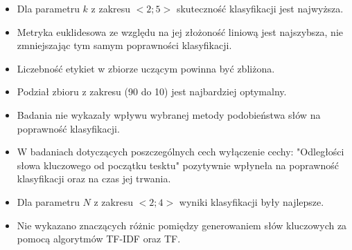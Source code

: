 \documentclass{classrep}
\begin{document}

\begin{itemize}
    \item Dla parametru $k$ z zakresu $<2;5>$ skuteczność klasyfikacji jest najwyższa.
    \item Metryka euklidesowa ze względu na jej złożoność liniową jest najszybsza, nie zmniejszając
            tym samym poprawności klasyfikacji.
    \item Liczebność etykiet w zbiorze uczącym powinna być zbliżona.
    \item Podział zbioru z zakresu (90 do 10) jest najbardziej optymalny.
    \item Badania nie wykazały wpływu wybranej metody podobieństwa słów na poprawność klasyfikacji.
    \item W badaniach dotyczących poszczególnych cech wyłączenie cechy: "Odległości słowa kluczowego
        od początku tesktu" pozytywnie wpłyneła na poprawność klasyfikacji oraz na czas jej trwania.
    \item Dla parametru $N$ z zakresu $<2;4>$ wyniki klasyfikacji były najlepsze.
    \item Nie wykazano znaczących różnic pomiędzy generowaniem słów kluczowych za pomocą algorytmów TF-IDF oraz TF.
\end{itemize}
\end{document}
